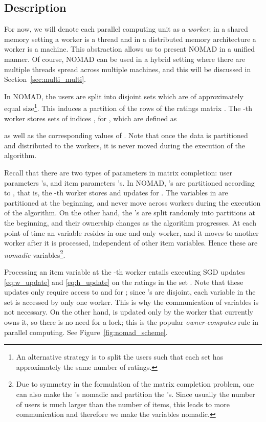 \documentclass{vldb}
\begin{document}
\subsection{Description}

For now, we will denote each parallel computing unit as a \emph{worker};
in a shared memory setting a worker is a thread and in a distributed
memory architecture a worker is a machine. This abstraction allows us to
present NOMAD in a unified manner. Of course, NOMAD can be used in a
hybrid setting where there are multiple threads spread across multiple
machines, and this will be discussed in Section~\ref{sec:multi_multi}.

In NOMAD, the users  are split into  disjoint
sets  which are of approximately equal
size\footnote{An alternative strategy is to split the users such that
  each set has approximately the same number of ratings.}. This
induces a partition of the rows of the ratings matrix . The -th
worker stores  sets of indices , for , which are defined as

as well as the corresponding values of . Note that once the data is
partitioned and distributed to the workers, it is never moved during
the execution of the algorithm. 


Recall that there are two types of parameters in matrix completion:
user parameters 's, and item parameters 's.  In NOMAD,
's are partitioned according to , that
is, the -th worker stores and updates  for .
The variables in  are partitioned at the beginning, and never move
across workers during the execution of the algorithm.  On the other
hand, the 's are split randomly into  partitions at the
beginning, and their ownership changes as the algorithm progresses. At
each point of time an  variable resides in one and only worker,
and it moves to another worker after it is processed, independent of
other item variables.  Hence these are \emph{nomadic}
variables\footnote{Due to symmetry in the formulation of the matrix
  completion problem, one can also make the 's nomadic and
  partition the 's. Since usually the number of users is much
  larger than the number of items, this leads to more communication
  and therefore we make the  variables nomadic.}.

Processing an item variable  at the -th worker entails
executing SGD updates \eqref{eq:w_update} and \eqref{eq:h_update} on the
ratings in the set .  Note that these updates only
require access to  and  for ; since 's
are disjoint, each  variable in the set is accessed by only one
worker.  This is why the communication of  variables is not
necessary.  On the other hand,  is updated only by the worker
that currently owns it, so there is no need for a lock; this is the
popular \emph{owner-computes} rule in parallel computing.  See
Figure~\ref{fig:nomad_scheme}.
\end{document}
